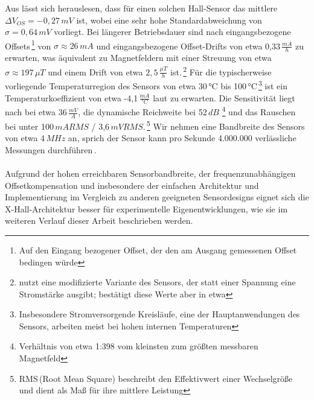 \documentclass[12pt, a4paper]{article}
\begin{document}
Aus \cite{cres18} lässt sich herauslesen, dass für einen solchen Hall-Sensor das mittlere $\Delta{V_{OS}}=-0,27\,mV$ ist, wobei eine sehr hohe Standardabweichung von $\sigma=0,64\,mV$ vorliegt.\newline
Bei längerer Betriebsdauer sind nach \cite{cres23} eingangsbezogene Offsets\,\footnote{Auf den Eingang bezogener Offset, der den am Ausgang gemessenen Offset bedingen würde} von $\sigma\approx26\,mA$ und eingangsbezogene Offset-Drifts von etwa 0,33\,$\frac{mA}{h}$ zu erwarten, was äquivalent zu Magnetfeldern mit einer Streuung von etwa $\sigma\approx197\,\mu{T}$ und einem Drift von etwa $2,5\,\frac{\mu{T}}{h}$ ist.\,\footnote{\cite{cres23} nutzt eine modifizierte Variante des Sensors, der statt einer Spannung eine Stromstärke ausgibt; \cite{cres21} bestätigt diese Werte aber in etwa}\newline
Für die typischerweise vorliegende Temperaturregion des Sensors von etwa 30\,°C bis 100\,°C\,\footnote{Insbesondere Stromversorgende Kreisläufe, eine der Hauptanwendungen des Sensors, arbeiten meist bei hohen internen Temperaturen} ist ein Temperaturkoeffizient von etwa -4,1\,$\frac{mA}{°C}$ laut \cite{cres23} zu erwarten.\newline
Die Sensitivität liegt nach \cite{cres21Hall} bei etwa 36\,$\frac{mV}{A}$, die dynamische Reichweite bei 52\,$dB$ \footnote{Verhältnis von etwa 1:398 vom kleinsten zum größten messbaren Magnetfeld} und das Rauschen bei unter 100\,$mA RMS$ / 3,6\,$mV RMS$.\,\footnote{RMS\,(Root Mean Square) beschreibt den Effektivwert einer Wechselgröße und dient als Maß für ihre mittlere Leistung}\newline
Wir nehmen eine Bandbreite des Sensors von etwa 4\,$MHz$ an, sprich der Sensor kann pro Sekunde 4.000.000 verlässliche Messungen durchführen\,\cite{cres21}. \paragraph{}

Aufgrund der hohen erreichbaren Sensorbandbreite, der frequenzunabhängigen Offsetkompensation und insbesondere der einfachen Architektur und Implementierung im Vergleich zu anderen geeigneten Sensordesigns eignet sich die X-Hall-Architektur besser für experimentelle Eigenentwicklungen, wie sie im weiteren Verlauf dieser Arbeit beschrieben werden. %
\end{document}
